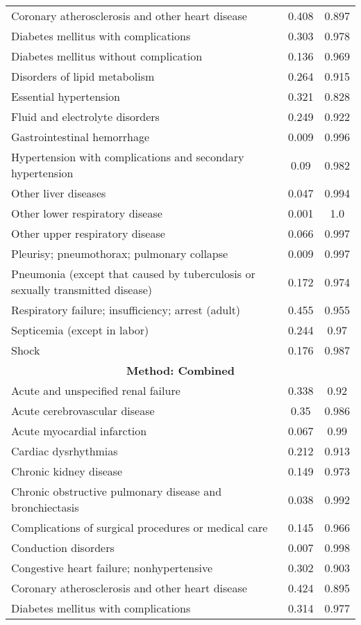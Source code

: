\documentclass{article}
\begin{document}
\begin{longtable}{lcc}
Coronary atherosclerosis and other heart disease & 0.408 & 0.897 \\
Diabetes mellitus with complications & 0.303 & 0.978 \\
Diabetes mellitus without complication & 0.136 & 0.969 \\
Disorders of lipid metabolism & 0.264 & 0.915 \\
Essential hypertension & 0.321 & 0.828 \\
Fluid and electrolyte disorders & 0.249 & 0.922 \\
Gastrointestinal hemorrhage & 0.009 & 0.996 \\
Hypertension with complications and secondary hypertension & 0.09 & 0.982 \\
Other liver diseases & 0.047 & 0.994 \\
Other lower respiratory disease & 0.001 & 1.0 \\
Other upper respiratory disease & 0.066 & 0.997 \\
Pleurisy; pneumothorax; pulmonary collapse & 0.009 & 0.997 \\
Pneumonia (except that caused by tuberculosis or sexually transmitted disease) & 0.172 & 0.974 \\
Respiratory failure; insufficiency; arrest (adult) & 0.455 & 0.955 \\
Septicemia (except in labor) & 0.244 & 0.97 \\
Shock & 0.176 & 0.987 \\
\midrule
\multicolumn{3}{c}{\textbf{Method: Combined}} \\
\midrule
Acute and unspecified renal failure & 0.338 & 0.92 \\
Acute cerebrovascular disease & 0.35 & 0.986 \\
Acute myocardial infarction & 0.067 & 0.99 \\
Cardiac dysrhythmias & 0.212 & 0.913 \\
Chronic kidney disease & 0.149 & 0.973 \\
Chronic obstructive pulmonary disease and bronchiectasis & 0.038 & 0.992 \\
Complications of surgical procedures or medical care & 0.145 & 0.966 \\
Conduction disorders & 0.007 & 0.998 \\
Congestive heart failure; nonhypertensive & 0.302 & 0.903 \\
Coronary atherosclerosis and other heart disease & 0.424 & 0.895 \\
Diabetes mellitus with complications & 0.314 & 0.977 \\

\end{longtable}
\end{document}
